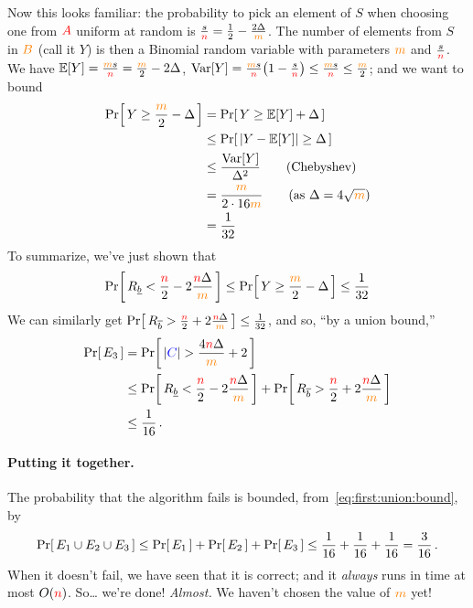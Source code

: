 Now this looks familiar: the probability to pick an element of $S$ when choosing one from $\textcolor{red}{A}$ uniform at random is $\frac{s}{{\textcolor{red}{n}}} = \frac{1}{2} - \frac{2\Delta}{\textcolor{orange}{m}}$. The number of elements from $S$ in $\textcolor{orange}{B}$ (call it $Y$) is then a Binomial random variable with parameters $\textcolor{orange}{m}$ and $\frac{s}{{\textcolor{red}{n}}}$. We have $\expect{Y} = \frac{\orange{m}s}{\ns} = \frac{\orange{m}}{2}-2\Delta$, $\var[Y] = \frac{\orange{m}s}{\ns}\Paren{1-\frac{s}{\ns}} \leq \frac{\orange{m}s}{\ns} \leq \frac{\orange{m}}{2}$; and we want to bound
\begin{align*}
    \probaOf{Y \geq \frac{\orange{m}}{2}-\Delta}
    &= \probaOf{Y \geq \expect{Y}+\Delta} \\
    &\leq  \probaOf{|Y - \expect{Y}| \geq \Delta} \\
    &\leq \frac{\var[Y]}{\Delta^2} \tag{Chebyshev}\\
    &= \frac{\orange{m}}{2\cdot 16\orange{m}} \tag{as $\Delta= 4\sqrt{\orange{m}}$}\\
    &= \frac{1}{32}
\end{align*}
To summarize, we've just shown that
\[
    \probaOf{ R_{\underline{b}} < \frac{\ns}{2} - 2\frac{\ns\Delta}{\orange{m}}} \leq \probaOf{Y \geq \frac{\orange{m}}{2}-\Delta} \leq \frac{1}{32}
\]
We can similarly get $\probaOf{ R_{\overline{b}} > \frac{\ns}{2} + 2\frac{\ns\Delta}{\orange{m}}} \leq \frac{1}{32}$, and so, ``by a union bound,''
\begin{align}
    \probaOf{E_3} &= \probaOf{|\blue{C}| > \frac{4\ns\Delta}{\orange{m}} + 2} \notag\\
    &\leq \probaOf{ R_{\underline{b}} < \frac{\ns}{2} - 2\frac{\ns\Delta}{\orange{m}}} + \probaOf{ R_{\overline{b}} > \frac{\ns}{2} + 2\frac{\ns\Delta}{\orange{m}}} \notag\\
    &\leq \frac{1}{16}\,.
\end{align}

\paragraph{Putting it together.}
The probability that the algorithm fails is bounded, from~\cref{eq:first:union:bound}, by
\[
\probaOf{E_1\cup E_2\cup E_3} \leq \probaOf{E_1}+\probaOf{E_2}+\probaOf{E_3} \leq \frac{1}{16} + \frac{1}{16} + \frac{1}{16} = \frac{3}{16}\,.
\]
When it doesn't fail, we have seen that it is correct; and it \emph{always} runs in time at most $O({\textcolor{red}{n}})$. So\dots{} we're done! \emph{Almost.} We haven't chosen the value of $\textcolor{orange}{m}$ yet!

